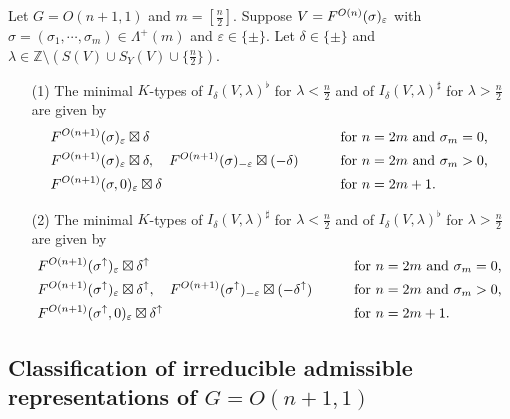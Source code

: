 \begin{proposition}
\label{prop:minKXred}
Let $G=O(n+1,1)$ and $m=[\frac n2]$.  
Suppose $V=F^{{O(n)}}({\sigma})_{\varepsilon}$
 with $\sigma=(\sigma_1, \cdots,\sigma_m) \in \Lambda^+(m)$
 and $\varepsilon \in \{\pm\}$.  
Let $\delta \in \{\pm\}$ 
 and $\lambda \in {\mathbb{Z}} \setminus (S(V) \cup S_Y(V) \cup \{\frac n 2\})$. 
\begin{enumerate}
\item[{\rm{(1)}}]
The minimal $K$-types of $I_{\delta}(V,\lambda)^{\flat}$ for $\lambda < \frac n 2$
 and of $I_{\delta}(V,\lambda)^{\sharp}$
 for $\lambda>\frac n 2$ are given by
\begin{alignat*}{2}
&F^{{O(n+1)}}({\sigma})_{\varepsilon}\boxtimes \delta
&&\text{for $n=2m$ and $\sigma_m=0$, }
\\
&F^{{O(n+1)}}({\sigma})_{\varepsilon}\boxtimes \delta,
\quad
F^{{O(n+1)}}({\sigma})_{-\varepsilon}\boxtimes (-\delta)
\qquad
&&\text{for $n=2m$ and $\sigma_m>0$, }
\\
&F^{{O(n+1)}}({\sigma,0})_{\varepsilon}\boxtimes \delta
\qquad
&&\text{for $n=2m+1$.}
\end{alignat*}
\item[{\rm{(2)}}]
The minimal $K$-types of $I_{\delta}(V,\lambda)^{\sharp}$ for $\lambda < \frac n 2$
 and of $I_{\delta}(V,\lambda)^{\flat}$
 for $\lambda > \frac n 2$ are given by
\begin{alignat*}{2}
&F^{{O(n+1)}}({\sigma^{\uparrow}})_{\varepsilon}\boxtimes \delta^{\uparrow}
&&\text{for $n=2m$ and $\sigma_m=0$, }
\\
&F^{{O(n+1)}}({\sigma^{\uparrow}})_{\varepsilon}\boxtimes \delta^{\uparrow},
\quad
F^{{O(n+1)}}({\sigma^{\uparrow}})_{-\varepsilon}\boxtimes (-\delta^{\uparrow})
\qquad
&&\text{for $n=2m$ and $\sigma_m>0$, }
\\
&F^{{O(n+1)}}({\sigma^{\uparrow},0})_{\varepsilon}\boxtimes \delta^{\uparrow}
\qquad
&&\text{for $n=2m+1$.}
\end{alignat*}
\end{enumerate}
\end{proposition}



\subsection{Classification of irreducible admissible representations
 of $G=O(n+1,1)$}

